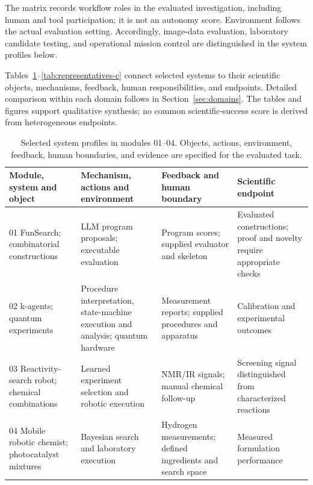 The matrix records workflow roles in the evaluated investigation, including human and tool participation; it is not an autonomy score. Environment follows the actual evaluation setting. Accordingly, image-data evaluation, laboratory candidate testing, and operational mission control are distinguished in the system profiles below.

Tables~\ref{tab:representatives-a}--\ref{tab:representatives-c} connect selected systems to their scientific objects, mechanisms, feedback, human responsibilities, and endpoints. Detailed comparison within each domain follows in Section~\ref{sec:domains}. The tables and figures support qualitative synthesis; no common scientific-success score is derived from heterogeneous endpoints.

\begin{table}[H]
\caption{Selected system profiles in modules 01--04. Objects, actions, environment, feedback, human boundaries, and evidence are specified for the evaluated task.}
\label{tab:representatives-a}
\scriptsize
\begin{tabularx}{\textwidth}{@{}p{}XXX@{}}
\toprule
Module, system and object & Mechanism, actions and environment & Feedback and human boundary & Scientific endpoint \\
\midrule
01 FunSearch; combinatorial constructions~\cite{asd0512} & LLM program proposals; executable evaluation & Program scores; supplied evaluator and skeleton & Evaluated constructions; proof and novelty require appropriate checks \\
02 k-agents; quantum experiments~\cite{asd0090} & Procedure interpretation, state-machine execution and analysis; quantum hardware & Measurement reports; supplied procedures and apparatus & Calibration and experimental outcomes \\
03 Reactivity-search robot; chemical combinations~\cite{asd0734} & Learned experiment selection and robotic execution & NMR/IR signals; manual chemical follow-up & Screening signal distinguished from characterized reactions \\
04 Mobile robotic chemist; photocatalyst mixtures~\cite{burger2020} & Bayesian search and laboratory execution & Hydrogen measurements; defined ingredients and search space & Measured formulation performance \\
\bottomrule
\end{tabularx}
\end{table}


